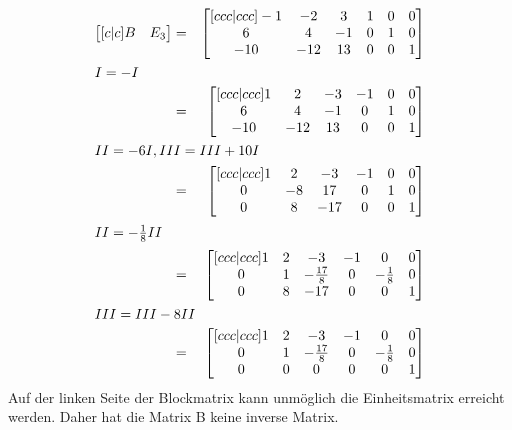 \documentclass[10pt,a4paper,oneside,ngerman,numbers=noenddot]{scrartcl}
\begin{document}
\subsection{} %
\begin{alignat*}{2}
\begin{bmatrix}[c|c]
B & E_{3}
\end{bmatrix} &=& 
\begin{bmatrix}[ccc|ccc]
-1 & -2 & 3 & 1 & 0 & 0 \\
6 & 4 & -1 & 0 & 1 & 0 \\
-10 & -12 & 13 & 0 & 0 & 1
\end{bmatrix} \\
\intertext{$I = -I$}
&=&
\begin{bmatrix}[ccc|ccc]
1 & 2 & -3 & -1 & 0 & 0 \\
6 & 4 & -1 & 0 & 1 & 0 \\
-10 & -12 & 13 & 0 & 0 & 1
\end{bmatrix} \\
\intertext{$II = -6I, III = III + 10I$}
&=&
\begin{bmatrix}[ccc|ccc]
1 & 2 & -3 & -1 & 0 & 0 \\
0 & -8 & 17 & 0 & 1 & 0 \\
0 & 8 & -17 & 0 & 0 & 1
\end{bmatrix} \\
\intertext{$II = -\frac{1}{8}II$}
&=&
\begin{bmatrix}[ccc|ccc]
1 & 2 & -3 & -1 & 0 & 0 \\
0 & 1 & -\frac{17}{8} & 0 & -\frac{1}{8} & 0 \\
0 & 8 & -17 & 0 & 0 & 1
\end{bmatrix} \\
\intertext{$III = III - 8II$}
&=&
\begin{bmatrix}[ccc|ccc]
1 & 2 & -3 & -1 & 0 & 0 \\
0 & 1 & -\frac{17}{8} & 0 & -\frac{1}{8} & 0 \\
0 & 0 & 0 & 0 & 0 & 1
\end{bmatrix}
\end{alignat*}
Auf der linken Seite der Blockmatrix kann unmöglich die Einheitsmatrix erreicht werden. Daher hat die Matrix B keine inverse Matrix.
\end{document}
